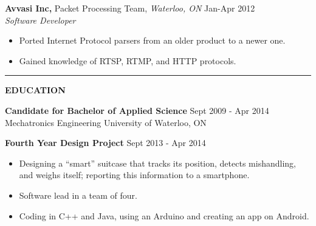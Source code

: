 \documentclass{letter}
\begin{document}
{\bf Avvasi Inc,} Packet Processing Team, {\sl Waterloo, ON} \hfill Jan-Apr 2012 \\
{\sl Software Developer}
\begin{itemize}
  \item Ported Internet Protocol parsers from an older product to a newer one.
  \item Gained knowledge of RTSP, RTMP, and HTTP protocols.
\end{itemize}

\vskip 2pt
\hrule
{\large\bf EDUCATION}

{\bf Candidate for Bachelor of Applied Science} \hfill Sept 2009 - Apr 2014 \\
Mechatronics Engineering \hfill University of Waterloo, ON

{\bf Fourth Year Design Project} \hfill Sept 2013 - Apr 2014
\begin{itemize}
  \item Designing a ``smart'' suitcase that tracks its position, detects mishandling, and weighs itself; reporting this information to a smartphone.
  \item Software lead in a team of four.
  \item Coding in C++ and Java, using an Arduino and creating an app on Android.
\end{itemize}
\end{document}
